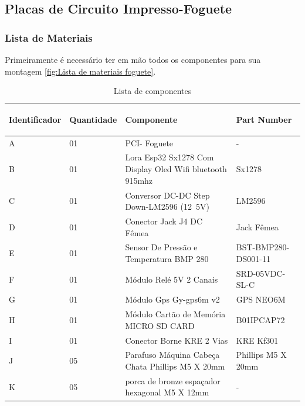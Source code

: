 \subsection{Placas de Circuito Impresso-Foguete}

\subsubsection{Lista de Materiais}

\par Primeiramente é necessário ter em mão todos os componentes para sua montagem \ref{fig:Lista de materiais foguete}.

\begin{table}[H]
\centering
\begin{tabular}{|m{1.9cm} |m{1.8cm} |m{7.3cm}|m{4cm}|}
\hline
\begin{center}Identificador\end{center} &\begin{center} Quantidade\end{center} & \begin{center}Componente\end{center} &\begin{center} Part Number\end{center} \\\hline
A&01 &  PCI- Foguete  & -  \\\hline
B &01&Lora Esp32 Sx1278 Com Display  Oled Wifi bluetooth 915mhz& Sx1278 \\\hline
 
C&01 &  Conversor DC-DC Step Down-LM2596 (12~5V)
& LM2596 \\\hline

D&01 & Conector Jack J4 DC Fêmea &  Jack Fêmea  \\\hline

E&01&Sensor De Pressão e Temperatura BMP 280 & BST-BMP280-DS001-11 \\\hline

F&01 &  Módulo Relé 5V 2 Canais &   SRD-05VDC-SL-C \\\hline

G &01 & Módulo Gps  Gy-gps6m v2 & GPS NEO6M \\\hline

H&01 & Módulo Cartão de Memória MICRO SD CARD & B01IPCAP72 \\\hline

I&01&Conector Borne KRE 2 Vias & KRE Kf301 \\\hline

J&05&Parafuso Máquina Cabeça Chata Phillips M5 X 20mm &  Phillips M5 X 20mm \\\hline

K&05& porca de bronze espaçador hexagonal M5 X 12mm & -  \\\hline

\end{tabular}
\caption{Lista de componentes}
\end{table}


